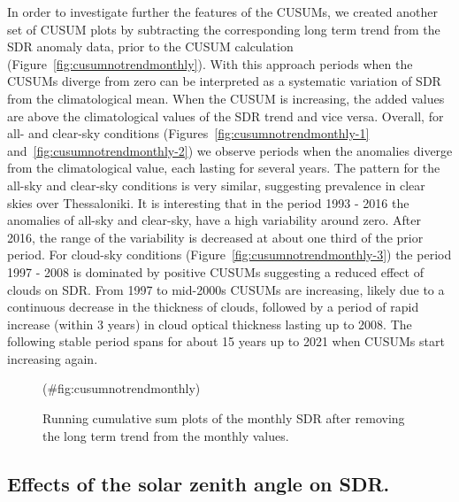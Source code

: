 \documentclass[
  preprint, 3p, authoryear]{article}
\begin{document}
In order to investigate further the features of the CUSUMs, we created another set of CUSUM plots by subtracting the corresponding long term trend from the SDR anomaly data, prior to the CUSUM calculation (Figure~\ref{fig:cusumnotrendmonthly}).
With this approach periods when the CUSUMs diverge from zero can be interpreted as a systematic variation of SDR from the climatological mean.
When the CUSUM is increasing, the added values are above the climatological values of the SDR trend and vice versa.
Overall, for all- and clear-sky conditions (Figures~\ref{fig:cusumnotrendmonthly-1} and~\ref{fig:cusumnotrendmonthly-2}) we observe periods when the anomalies diverge from the climatological value, each lasting for several years.
The pattern for the all-sky and clear-sky conditions is very similar, suggesting prevalence in clear skies over Thessaloniki.
It is interesting that in the period 1993 - 2016 the anomalies of all-sky and clear-sky, have a high variability around zero. After 2016, the range of the variability is decreased at about one third of the prior period.
For cloud-sky conditions (Figure~\ref{fig:cusumnotrendmonthly-3}) the period 1997 - 2008 is dominated by positive CUSUMs suggesting a reduced effect of clouds on SDR.
From 1997 to mid-2000s CUSUMs are increasing, likely due to a continuous decrease in the thickness of clouds, followed by a period of rapid increase (within 3 years) in cloud optical thickness lasting up to 2008.
The following stable period spans for about 15 years up to 2021 when CUSUMs start increasing again.

\begin{figure}[h!]

{\centering {}

}

\caption{Running cumulative sum plots of the monthly SDR after removing the long term trend from the monthly values.}(\#fig:cusumnotrendmonthly)
\end{figure}

\hypertarget{effects-of-the-solar-zenith-angle-on-sdr.}{%
\subsection{Effects of the solar zenith angle on SDR.}\label{effects-of-the-solar-zenith-angle-on-sdr.}}
\end{document}

